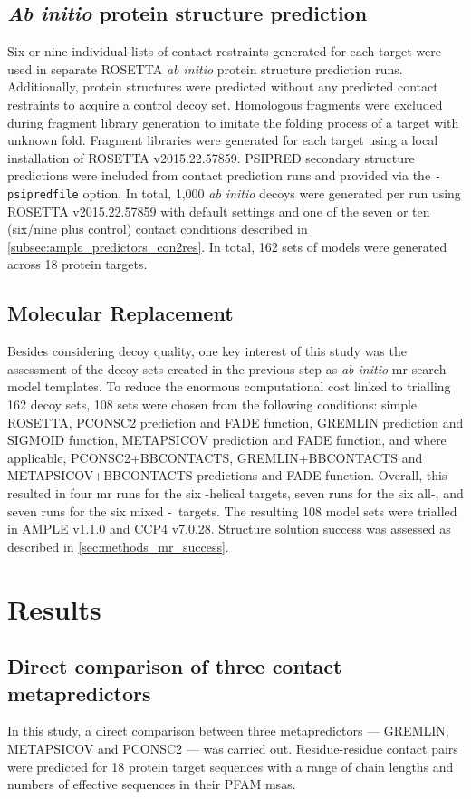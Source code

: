 \subsection{\textit{Ab initio} protein structure prediction}
Six or nine individual lists of contact restraints generated for each target were used in separate ROSETTA \textit{ab initio} protein structure prediction runs. Additionally, protein structures were predicted without any predicted contact restraints to acquire a control decoy set. Homologous fragments were excluded during fragment library generation to imitate the folding process of a target with unknown fold. Fragment libraries were generated for each target using a local installation of ROSETTA v2015.22.57859. PSIPRED secondary structure predictions were included from contact prediction runs and provided via the \texttt{-psipredfile} option. In total, 1,000 \textit{ab initio} decoys were generated per run using ROSETTA v2015.22.57859 with default settings \cite{Rohl2004-dj} and one of the seven or ten (six/nine plus control) contact conditions described in \cref{subsec:ample_predictors_con2res}. In total, 162 sets of models were generated across 18 protein targets.

\subsection{Molecular Replacement}
Besides considering decoy quality, one key interest of this study was the assessment of the decoy sets created in the previous step as \textit{ab initio} \gls{mr} search model templates. To reduce the enormous computational cost linked to trialling 162 decoy sets, 108 sets were chosen from the following conditions: simple ROSETTA, PCONSC2 prediction and FADE function, GREMLIN prediction and SIGMOID function, METAPSICOV prediction and FADE function, and where applicable, PCONSC2+BBCONTACTS, GREMLIN+BBCONTACTS and METAPSICOV+BBCONTACTS predictions and FADE function. Overall, this resulted in four \gls{mr} runs for the six \textalpha-helical targets, seven runs for the six all-\textbeta, and seven runs for the six mixed \textalpha-\textbeta\ targets. The resulting 108 model sets were trialled in AMPLE v1.1.0 and CCP4 v7.0.28. Structure solution success was assessed as described in \cref{sec:methods_mr_success}.

\section{Results}
\subsection{Direct comparison of three contact metapredictors}
In this study, a direct comparison between three metapredictors --- GREMLIN, METAPSICOV and PCONSC2 --- was carried out. Residue-residue contact pairs were predicted for 18 protein target sequences with a range of chain lengths and numbers of effective sequences in their PFAM \gls{msa}s.


